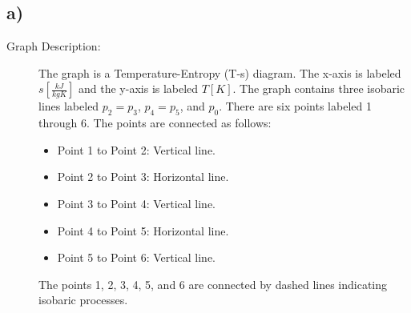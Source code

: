 

\subsection*{a)}

\begin{description}
    \item[Graph Description:] The graph is a Temperature-Entropy (T-s) diagram. The x-axis is labeled $s \left[ \frac{kJ}{kgK} \right]$ and the y-axis is labeled $T[K]$. The graph contains three isobaric lines labeled $p_2 = p_3$, $p_4 = p_5$, and $p_0$. There are six points labeled 1 through 6. The points are connected as follows:
    \begin{itemize}
        \item Point 1 to Point 2: Vertical line.
        \item Point 2 to Point 3: Horizontal line.
        \item Point 3 to Point 4: Vertical line.
        \item Point 4 to Point 5: Horizontal line.
        \item Point 5 to Point 6: Vertical line.
    \end{itemize}
    The points 1, 2, 3, 4, 5, and 6 are connected by dashed lines indicating isobaric processes.
\end{description}